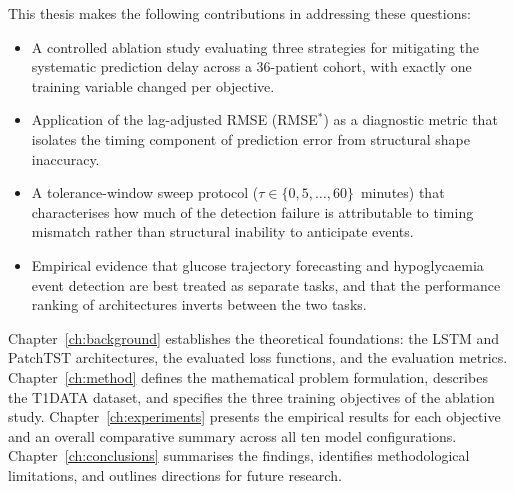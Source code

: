 This thesis makes the following contributions in addressing these questions:

\begin{itemize}
    \item A controlled ablation study evaluating three strategies for mitigating the systematic prediction delay across a 36-patient cohort, with exactly one training variable changed per objective.
    \item Application of the lag-adjusted RMSE (RMSE$^*$) as a diagnostic metric that isolates the timing component of prediction error from structural shape inaccuracy.
    \item A tolerance-window sweep protocol ($\tau \in \{0, 5, \ldots, 60\}$~minutes) that characterises how much of the detection failure is attributable to timing mismatch rather than structural inability to anticipate events.
    \item Empirical evidence that glucose trajectory forecasting and hypoglycaemia event detection are best treated as separate tasks, and that the performance ranking of architectures inverts between the two tasks.
\end{itemize}

Chapter~\ref{ch:background} establishes the theoretical foundations: the LSTM and PatchTST architectures, the evaluated loss functions, and the evaluation metrics. Chapter~\ref{ch:method} defines the mathematical problem formulation, describes the T1DATA dataset, and specifies the three training objectives of the ablation study. Chapter~\ref{ch:experiments} presents the empirical results for each objective and an overall comparative summary across all ten model configurations. Chapter~\ref{ch:conclusions} summarises the findings, identifies methodological limitations, and outlines directions for future research.
